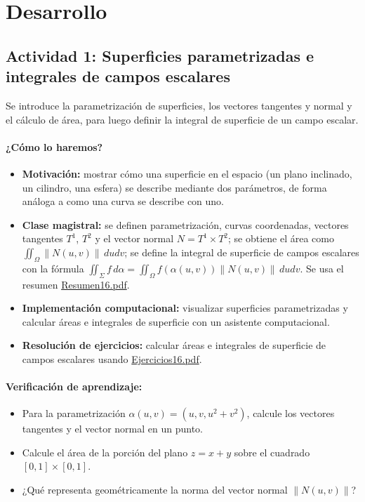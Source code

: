 \documentclass[a4,11pt]{aleph-notas}
\begin{document}
\section*{Desarrollo}

\subsection*{Actividad 1: Superficies parametrizadas e integrales de campos escalares}
Se introduce la parametrización de superficies, los vectores tangentes y normal y el cálculo de área, para luego definir la integral de superficie de un campo escalar.

\paragraph{¿Cómo lo haremos?}
\begin{itemize}[leftmargin=*]
    \item \textbf{Motivación:} mostrar cómo una superficie en el espacio (un plano inclinado, un cilindro, una esfera) se describe mediante dos parámetros, de forma análoga a como una curva se describe con uno.
    \item \textbf{Clase magistral:} se definen parametrización, curvas coordenadas, vectores tangentes $T^1$, $T^2$ y el vector normal $N=T^1\times T^2$; se obtiene el área como $\iint_\Omega \|N(u,v)\|\,dudv$; se define la integral de superficie de campos escalares con la fórmula $\iint_\Sigma f\,d\alpha=\iint_\Omega f(\alpha(u,v))\|N(u,v)\|\,dudv$. Se usa el resumen \href{https://andres-merino.github.io/MatematicaIII-05-N0051/01Resumen/Resumen16.pdf}{Resumen16.pdf}.
    \item \textbf{Implementación computacional:} visualizar superficies parametrizadas y calcular áreas e integrales de superficie con un asistente computacional.
    \item \textbf{Resolución de ejercicios:} calcular áreas e integrales de superficie de campos escalares usando \href{https://andres-merino.github.io/MatematicaIII-05-N0051/04Ejercicios/Ejercicios16.pdf}{Ejercicios16.pdf}.
\end{itemize}

\paragraph{Verificación de aprendizaje:}
\begin{itemize}[leftmargin=*]
    \item Para la parametrización $\alpha(u,v)=(u,v,u^2+v^2)$, calcule los vectores tangentes y el vector normal en un punto.
    \item Calcule el área de la porción del plano $z=x+y$ sobre el cuadrado $[0,1]\times[0,1]$.
    \item ¿Qué representa geométricamente la norma del vector normal $\|N(u,v)\|$?
\end{itemize}
\end{document}
